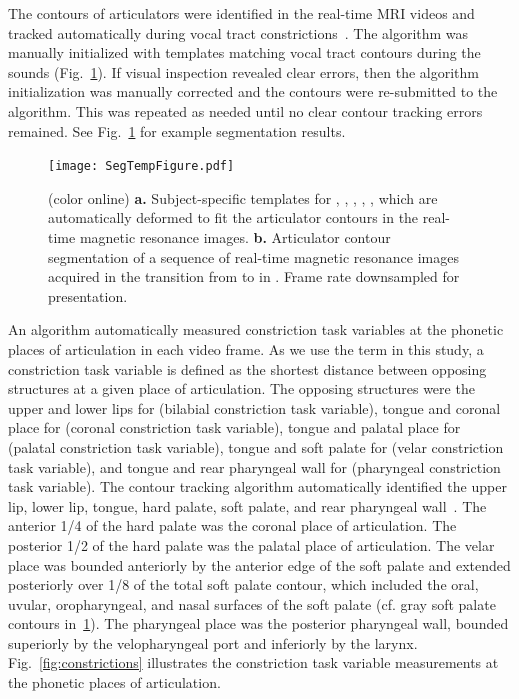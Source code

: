 \documentclass[preprint]{JASAnew}\usepackage[]{graphicx}\usepackage[]{color}
\begin{document}
The contours of articulators were identified in the real-time MRI videos and tracked automatically during vocal tract constrictions~\citep{bresch2009region}. The algorithm was manually initialized with templates matching vocal tract contours during the sounds \textipa{[A], [i], [p], [t], [k]} (Fig.~\ref{fig:segtemp}). 
%
If visual inspection revealed clear errors, then the algorithm initialization was manually corrected and the contours were re-submitted to the algorithm. This was repeated as needed until no clear contour tracking errors remained. 
%
See Fig.~\ref{fig:segtemp} for example segmentation results.

\begin{figure}

\texttt{[image: SegTempFigure.pdf]}

\caption{(color online) {\bf a.} Subject-specific templates for \textipa{[A]}, \textipa{[i]}, \textipa{[p]}, \textipa{[t]}, \textipa{[k]}, which are automatically deformed to fit the articulator contours in the real-time magnetic resonance images.
{\bf b.} Articulator contour segmentation of a sequence of real-time magnetic resonance images acquired in the transition from \textipa{[A]} to \textipa{[i]} in \textipa{[AiA]}. Frame rate downsampled for presentation.}
\label{fig:segtemp}
\end{figure}



An algorithm automatically measured constriction task variables at the phonetic places of articulation in each video frame. 
%
As we use the term in this study, a constriction task variable is defined as the shortest distance between opposing structures at a given place of articulation. 
%
The opposing structures were the upper and lower lips for \textipa{[p]} (bilabial constriction task variable), tongue and coronal place for \textipa{[t]} (coronal constriction task variable), tongue and palatal place for \textipa{[i]} (palatal constriction task variable), tongue and soft palate for \textipa{[k]} (velar constriction task variable), and tongue and rear pharyngeal wall for \textipa{[A]} (pharyngeal constriction task variable). 
%
The contour tracking algorithm automatically identified the upper lip, lower lip, tongue, hard palate, soft palate, and rear pharyngeal wall~\citep{bresch2009region}.  
%
The anterior \num{1/4} of the hard palate was the coronal place of articulation. 
%
The posterior \num{1/2} of the hard palate was the palatal place of articulation.
%
The velar place was bounded anteriorly by the anterior edge of the soft palate and extended posteriorly over \num{1/8} of the total soft palate contour, which included the oral, uvular, oropharyngeal, and nasal surfaces of the soft palate (cf. gray soft palate contours in~\ref{fig:segtemp}).
%
The pharyngeal place was the posterior pharyngeal wall, bounded superiorly by the velopharyngeal port and inferiorly by the larynx. 
%
Fig.~\ref{fig:constrictions} illustrates the constriction task variable measurements at the phonetic places of articulation.
\end{document}
